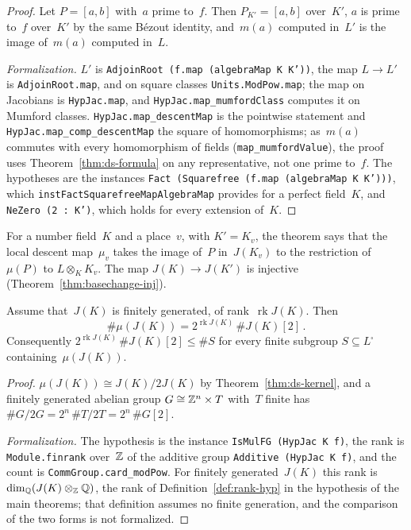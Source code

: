 \begin{proof}
\leanok
{}
Let $P = [a, b]$ with~$a$ prime to~$f$. Then $P_{K'} = [a, b]$ over~$K'$, $a$ is prime to~$f$
over~$K'$ by the same B\'ezout identity, and~$m(a)$ computed in~$L'$ is the image of~$m(a)$
computed in~$L$.

\emph{Formalization.} $L'$ is \texttt{AdjoinRoot (f.map (algebraMap K K'))}, the map $L \to L'$
is \texttt{AdjoinRoot.map}, and on square classes \texttt{Units.ModPow.map}; the map on Jacobians
is \texttt{HypJac.map}, and \texttt{HypJac.map\_mumfordClass} computes it on Mumford classes.
\texttt{HypJac.map\_descentMap} is the pointwise statement and \texttt{HypJac.map\_comp\_descentMap}
the square of homomorphisms; as~$m(a)$ commutes with every homomorphism of fields
(\texttt{map\_mumfordValue}), the proof uses Theorem~\ref{thm:ds-formula} on any representative,
not one prime to~$f$. The hypotheses are the instances
\texttt{Fact (Squarefree (f.map (algebraMap K K')))}, which
\texttt{instFactSquarefreeMapAlgebraMap} provides for a perfect field~$K$, and
\texttt{NeZero (2 : K')}, which holds for every extension of~$K$.
\end{proof}

For a number field~$K$ and a place~$v$, with $K' = K_v$, the theorem says that the local descent
map~$\mu_v$ takes the image of~$P$ in~$J(K_v)$ to the restriction of~$\mu(P)$ to $L \otimes_K
K_v$. The map $J(K) \to J(K')$ is injective (Theorem~\ref{thm:basechange-inj}).

\begin{theorem}[Rank]
\label{thm:ds-rank}
\leanok
{}
Assume that~$J(K)$ is finitely generated, of rank~$\operatorname{rk} J(K)$. Then
\[ \#\mu(J(K)) = 2^{\operatorname{rk} J(K)}\,\#J(K)[2]\,. \]
Consequently $2^{\operatorname{rk} J(K)}\,\#J(K)[2] \le \#S$ for every finite subgroup
$S \subseteq L^\square$ containing~$\mu(J(K))$.
\end{theorem}

\begin{proof}
\leanok
{}
$\mu(J(K)) \cong J(K)/2J(K)$ by Theorem~\ref{thm:ds-kernel}, and a finitely generated abelian
group $G \cong \mathbb{Z}^n \times T$ with~$T$ finite has $\#G/2G = 2^n\,\#T/2T = 2^n\,\#G[2]$.

\emph{Formalization.} The hypothesis is the instance \texttt{IsMulFG (HypJac K f)}, the rank is
\texttt{Module.finrank} over~$\mathbb{Z}$ of the additive group \texttt{Additive (HypJac K f)}, and the
count is \texttt{CommGroup.card\_modPow}. For finitely generated~$J(K)$ this rank is
$\dim_{\mathbb{Q}}(J(K) \otimes_{\mathbb{Z}} \mathbb{Q})$, the rank of Definition~\ref{def:rank-hyp} in the hypothesis of
the main theorems; that definition assumes no finite generation, and the comparison of the two
forms is not formalized.
\end{proof}

